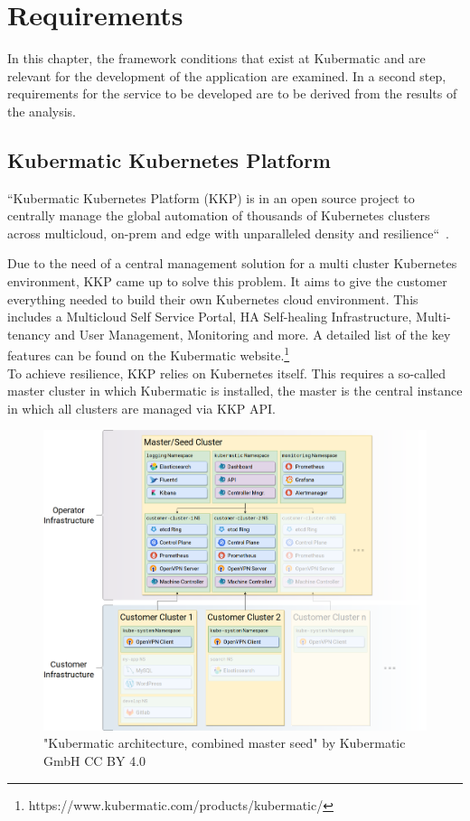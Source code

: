 \chapter{Requirements}

In this chapter, the framework conditions that exist at Kubermatic and are relevant for the development of the application are examined.
In a second step, requirements for the service to be developed are to be derived from the results of the analysis.

\section{Kubermatic Kubernetes Platform}

``Kubermatic Kubernetes Platform (KKP) is in an open source project to centrally manage the global automation of thousands of Kubernetes clusters across multicloud, on-prem and edge with unparalleled density and resilience``~\cite{KKP-GITHUB}.

Due to the need of a central management solution for a multi cluster Kubernetes environment, KKP came up to solve this problem.
It aims to give the customer everything needed to build their own Kubernetes cloud environment. 
This includes a Multicloud Self Service Portal, HA Self-healing Infrastructure, Multi-tenancy and User Management, Monitoring and more.
A detailed list of the key features can be found on the Kubermatic website.\footnote{https://www.kubermatic.com/products/kubermatic/}
\\
To achieve resilience, KKP relies on Kubernetes itself.
This requires a so-called master cluster in which Kubermatic is installed, the master is the central instance in which all clusters are managed via KKP API.

\begin{figure}[H]
    \centering
    \includegraphics[width=1\textwidth, left]{media/05/kkp}
    \caption{"Kubermatic architecture, combined master seed" by Kubermatic GmbH CC BY 4.0}
    \label{fig:kubermatic}
\end{figure}


